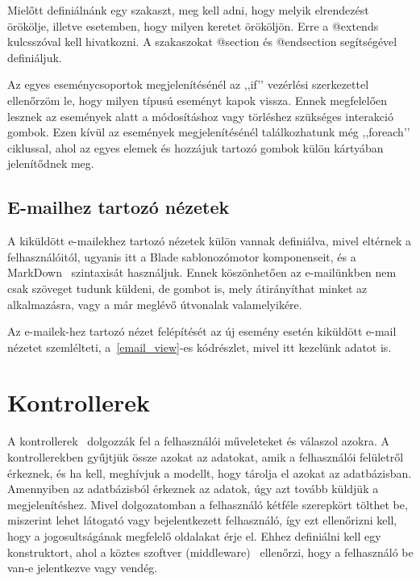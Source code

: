 \documentclass[
]{thesis-ekf}
\theoremstyle{definition}
\theoremstyle{remark}
\begin{document}
	Mielőtt definiálnánk egy szakaszt, meg kell adni, hogy melyik elrendezést örökölje, illetve esetemben, hogy milyen keretet örököljön. Erre a @extends kulcsszóval kell hivatkozni. A szakaszokat @section és @endsection segítségével definiáljuk.
	
	Az egyes eseménycsoportok megjelenítésénél az ,,if’’ vezérlési szerkezettel ellenőrzöm le, hogy milyen típusú eseményt kapok vissza. Ennek megfelelően lesznek az események alatt a módosításhoz vagy törléshez szükséges interakció gombok. Ezen kívül az események megjelenítésénél találkozhatunk még ,,foreach’’ ciklussal, ahol az egyes elemek és hozzájuk tartozó gombok külön kártyában jelenítődnek meg. 
	
	\subsection{E-mailhez tartozó nézetek}
	A kiküldött e-mailekhez tartozó nézetek külön vannak definiálva, mivel eltérnek a felhasználóitól, ugyanis itt a Blade sablonozómotor komponenseit, és a MarkDown~\cite{markdown_page} szintaxisát használjuk. Ennek köszönhetően az e-mailünkben nem csak szöveget tudunk küldeni, de gombot is, mely átirányíthat minket az alkalmazásra, vagy a már meglévő útvonalak valamelyikére.
	
	Az e-mailek-hez tartozó nézet felépítését az új esemény esetén kiküldött e-mail nézetet szemlélteti, a~\ref{email_view}-es kódrészlet, mivel itt kezelünk adatot is. 
	
	
	
	\section{Kontrollerek}
	A kontrollerek~\cite{laravel_controller} dolgozzák fel a felhasználói műveleteket és válaszol azokra. A kontrollerekben gyűjtjük össze azokat az adatokat, amik a felhasználói felületről érkeznek, és ha kell, meghívjuk a modellt, hogy tárolja el azokat az adatbázisban. Amennyiben az adatbázisból érkeznek az adatok, úgy azt tovább küldjük a megjelenítéshez. Mivel dolgozatomban a felhasználó kétféle szerepkört tölthet be, miszerint lehet látogató vagy bejelentkezett felhasználó, így ezt ellenőrizni kell, hogy a jogosultságának megfelelő oldalakat érje el. Ehhez definiálni kell egy konstruktort, ahol a köztes szoftver (middleware)~\cite{laravel_middlewear} ellenőrzi, hogy a felhasználó be van-e jelentkezve vagy vendég.
	
\end{document}
